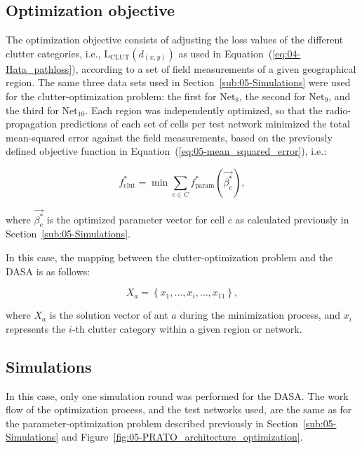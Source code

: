 \subsection{Optimization objective \label{sub:Optimization-objective}}

The optimization objective consists of adjusting the loss values of
the different clutter categories, i.e., $\mathrm{L}{}_{\mathrm{CLUT}}(d_{(x,y)})$
as used in Equation~(\ref{eq:04-Hata_pathloss}), according to a
set of field measurements of a given geographical region. The same
three data sets used in Section~\ref{sub:05-Simulations} were used
for the clutter-optimization problem: the first for Net$_{8}$, the
second for Net$_{9}$, and the third for Net$_{10}$. Each region
was independently optimized, so that the radio-propagation predictions
of each set of cells per test network minimized the total mean-squared
error against the field measurements, based on the previously defined
objective function in Equation~(\ref{eq:05-mean_squared_error}),
i.e.:

\begin{equation}
f_{\mathrm{clut}}^{*}=\min\sum_{c\in C}f_{\mathrm{param}}^{*}(\vec{\beta_{c}^{*}}),\label{eq:05-clutter_problem_objective}
\end{equation}



\noindent where $\vec{\beta_{c}^{*}}$ is the optimized parameter
vector for cell $c$ as calculated previously in Section~\ref{sub:05-Simulations}.

\bigskip{}


In this case, the mapping between the clutter-optimization problem
and the DASA is as follows:

\begin{equation}
X_{a}=\left\{ x_{1},\ldots,x_{i},\ldots,x_{11}\right\} ,\label{eq:DASA-problem_mapping}
\end{equation}


\noindent where $X_{a}$ is the solution vector of ant $a$ during
the minimization process, and $x_{i}$ represents the $i$-th clutter
category within a given region or network.


\subsection{Simulations}

In this case, only one simulation round was performed for the DASA.
The work flow of the optimization process, and the test networks used,
are the same as for the parameter-optimization problem described previously
in Section~\ref{sub:05-Simulations} and Figure~\ref{fig:05-PRATO_architecture_optimization}.

